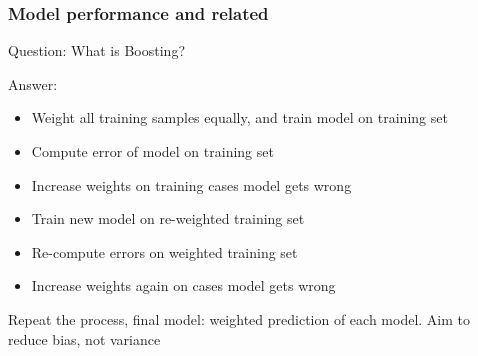 \documentclass[11pt]{beamer}
\begin{document}
\begin{frame}
\frametitle{Model performance and related}
\begin{block}{Question:}
	What is Boosting?
\end{block}
\begin{block}{Answer:}
	\begin{itemize}
		\item Weight all training samples equally, and train model on training set
		\item Compute error of model on training set
		\item Increase weights on training cases model gets wrong
		\item Train new model on re-weighted training set
		\item Re-compute errors on weighted training set
		\item Increase weights again on cases model gets wrong
	\end{itemize}
Repeat the process, final model: weighted prediction of each model. Aim to reduce bias, not variance
\end{block}
\end{frame}
\end{document}
